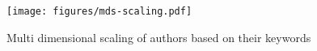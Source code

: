 \begin{figure}
    \centering
    \texttt{[image: figures/mds-scaling.pdf]}
    \caption{Multi dimensional scaling of authors based on their keywords}
    \label{fig:mds-scale}
\end{figure}